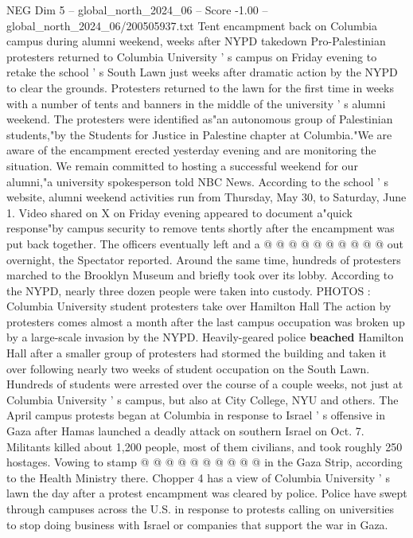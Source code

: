 \begin{textsample}{NEG Dim 5 – global\_north\_2024\_06 – Score -1.00 – global\_north\_2024\_06/200505937.txt}  \label{ex:f5_neg_088}
Tent encampment back on Columbia campus during alumni weekend, weeks after NYPD takedown Pro-Palestinian protesters returned to Columbia University ' s campus on Friday evening to retake the school ' s South Lawn just weeks after dramatic action by the NYPD to clear the grounds.
Protesters returned to the lawn for the first time in weeks with a number of tents and banners in the middle of the university ' s alumni weekend.
The protesters were identified as"an autonomous group of Palestinian students,"by the Students for Justice in Palestine chapter at Columbia."We are aware of the encampment erected yesterday evening and are monitoring the situation.
We remain committed to hosting a successful weekend for our alumni,"a university spokesperson told NBC News.
According to the school ' s website, alumni weekend activities run from Thursday, May 30, to Saturday, June 1.
Video shared on X on Friday evening appeared to document a"quick response"by campus security to remove tents shortly after the encampment was put back together.
The officers eventually left and a @ @ @ @ @ @ @ @ @ @ out overnight, the Spectator reported.
Around the same time, hundreds of protesters marched to the Brooklyn Museum and briefly took over its lobby.
According to the NYPD, nearly three dozen people were taken into custody.
PHOTOS : Columbia University student protesters take over Hamilton Hall The action by protesters comes almost a month after the last campus occupation was broken up by a large-scale invasion by the NYPD.
Heavily-geared police \textbf{beached} Hamilton Hall after a smaller group of protesters had stormed the building and taken it over following nearly two weeks of student occupation on the South Lawn.
Hundreds of students were arrested over the course of a couple weeks, not just at Columbia University ' s campus, but also at City College, NYU and others.
The April campus protests began at Columbia in response to Israel ' s offensive in Gaza after Hamas launched a deadly attack on southern Israel on Oct. 7.
Militants killed about 1,200 people, most of them civilians, and took roughly 250 hostages.
Vowing to stamp @ @ @ @ @ @ @ @ @ @ in the Gaza Strip, according to the Health Ministry there.
Chopper 4 has a view of Columbia University ' s lawn the day after a protest encampment was cleared by police.
Police have swept through campuses across the U.S. in response to protests calling on universities to stop doing business with Israel or companies that support the war in Gaza.

\end{textsample}
